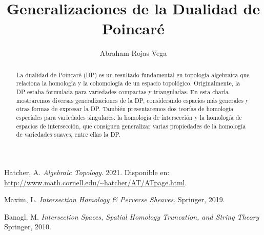 \documentclass[12pt]{article}
\title{Generalizaciones de la Dualidad de Poincaré}
\author{Abraham Rojas Vega}
\affil{Instituto de Ciências Matemáticas e de Computação, Universidade de São Paulo, Brasil}
\date{}
\begin{document}
\maketitle 

\begin{abstract}

La dualidad de Poincaré (DP) es un resultado fundamental en topología algebraica que relaciona la homología y la cohomología de un espacio topológico. Originalmente, la DP estaba formulada para variedades compactas y trianguladas. En esta charla mostraremos diversas generalizaciones de la DP, considerando espacios más generales y otras formas de expresar la DP. También presentaremos dos teorías de homología especiales para variedades singulares: la homología de intersección y la homología de espacios de intersección, que consiguen generalizar varias propiedades de la homología de variedades suaves, entre ellas la DP.

\end{abstract}

\begin{scriptsize}
    
    \begin{thebibliography}{9}
        Hatcher, A.
        \textit{Algebraic Topology}. 2021. Disponible en: \url{http://www.math.cornell.edu/~hatcher/AT/ATpage.html}.
        
        Maxim, L.
        \textit{Intersection Homology \& Perverse Sheaves}.
        Springer, 2019.
        
        Banagl, M.
        \textit{Intersection Spaces, Spatial Homology Truncation, and String Theory}
        Springer, 2010.
    \end{thebibliography}
\end{scriptsize}
\end{document}
